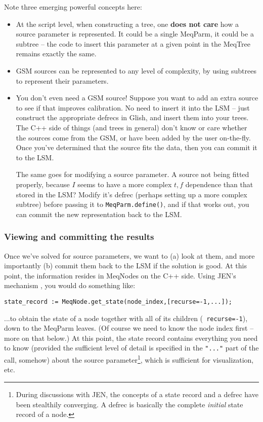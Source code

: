 \documentclass[]{lofar}
\begin{document}
  Note three emerging powerful concepts here:
  
  \begin{itemize}
  \item At the script level, when constructing a tree, one {\bf does not care} how
  a source parameter is represented. It could be a single MeqParm, it could be a
  subtree -- the code to insert this parameter at a given point in the
  MeqTree remains exactly the same.
  
  \item GSM sources can be represented to any level of complexity, by using
  subtrees to represent their parameters.
  
  \item You don't even need a GSM source! Suppose you want to add an extra source
  to see if that improves calibration. No need to insert it into the LSM --  just
  construct the appropriate defrecs in Glish, and insert them into your trees.
  The C++ side of things (and trees in general) don't know or care whether the
  sources come from the GSM, or have been added by the user on-the-fly. Once
  you've determined that the source fits the data, then you can commit it to
  the LSM.
  
  The same goes for modifying a source parameter. A source not being fitted
  properly, because $I$ seems to have a more complex $t,f$ dependence than that 
  stored in the LSM? Modify it's defrec (perhaps setting up a more complex
  subtree) before passing it to {\tt MeqParm.define()}, and if that works out,
  you can commit the new representation back to the LSM. 
  \end{itemize}
  
\subsubsection{Viewing and committing the results}
  
  Once we've solved for source parameters, we want to (a) look at them, and more
  importantly (b) commit them back to the LSM if the solution is good. At this
  point, the information resides in MeqNodes on the C++ side. Using JEN's
  mechanism \cite{PSS4}, you would do something like:
  
\begin{verbatim}
state_record := MeqNode.get_state(node_index,[recurse=-1,...]);
\end{verbatim}
  
  ...to obtain the state of a node together with all of its children ({\tt
  recurse=-1}), down to the MeqParm leaves. (Of course we need to know the node
  index first -- more on that below.) At this point, the state record contains
  everything you need to know (provided the sufficient level of detail is
  specified in the {\tt "..."} part of the call, somehow) about the source
  parameter\footnote{During discussions with JEN, the concepts of a state record
  and a defrec have been stealthily converging. A defrec is basically the
  complete {\em initial} state record of a node.}, which is sufficient for
  visualization, etc. 
  
\end{document}
